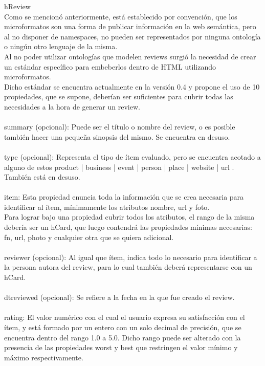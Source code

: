 hReview\\
Como se mencionó anteriormente, está establecido por convención, que los microformatos son una forma de publicar información en la 
web semántica, pero al no disponer de namespaces, no pueden ser representados por ninguna ontología o ningún otro lenguaje de la misma. \\
Al no poder utilizar ontologías que modelen reviews surgió la necesidad de crear un estándar específico para embeberlos dentro de HTML 
utilizando microformatos.\\
Dicho estándar se encuentra actualmente en la versión 0.4 y propone el uso de 10 propiedades, que se supone, deberían ser 
suficientes para cubrir todas las necesidades a la hora de generar un review.\\
\\
summary (opcional): Puede ser el título o nombre del review, o es posible también hacer una pequeña sinopsis del mismo. Se encuentra en desuso.\\
\\
type (opcional): Representa el tipo de ítem evaluado, pero se encuentra acotado a alguno de estos  product | business | event | person | place | website | url .\\
También está en desuso.\\
\\
item: Esta propiedad enuncia toda la información que se crea necesaria para identificar al ítem, mínimamente los atributos nombre, url y foto.\\
Para lograr bajo una propiedad cubrir todos los atributos, el rango de la misma debería ser un hCard, que luego contendrá las propiedades mínimas necesarias: 
fn, url, photo y cualquier otra que se quiera adicional.\\
\\
reviewer (opcional): Al igual que ítem, indica todo lo necesario para identificar a la persona autora del review, para lo cual también deberá representarse 
con un hCard. \\
\\
dtreviewed (opcional): Se refiere a la fecha en la que fue creado el review. \\
\\
rating: El valor numérico con el cual el usuario expresa su satisfacción con el ítem, y está formado por un entero con un solo decimal 
de precisión, que se encuentra dentro del rango 1.0 a 5.0. Dicho rango puede ser alterado con la presencia de las propiedades worst y best 
que restringen el valor mínimo y máximo respectivamente.\\
